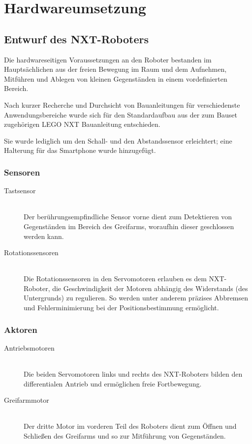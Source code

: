 \chapter{Hardwareumsetzung}
\section{Entwurf des NXT-Roboters}

Die hardwareseitigen Voraussetzungen an den Roboter bestanden im Hauptsächlichen aus der freien Bewegung im Raum und dem Aufnehmen, Mitführen und Ablegen von kleinen Gegenständen in einem vordefinierten Bereich.

Nach kurzer Recherche\cite{building_instructions} und Durchsicht von Bauanleitungen für verschiedenste Anwendungsbereiche wurde sich für den Standardaufbau aus der zum Bauset zugehörigen LEGO NXT Bauanleitung entschieden.

Sie wurde lediglich um den Schall- und den Abstandssensor erleichtert; eine Halterung für das Smartphone wurde hinzugefügt.


\pagebreak

\subsection{Sensoren}

\begin{description}
\item[Tastsensor]\hfill \\
Der berührungsempfindliche Sensor vorne dient zum Detektieren von Gegenständen im Bereich des Greifarms, woraufhin dieser geschlossen werden kann.
\item[Rotationssensoren]\hfill \\
Die Rotationssensoren in den Servomotoren erlauben es dem NXT-Roboter, die Geschwindigkeit der Motoren abhängig des Widerstands (des Untergrunds) zu regulieren. So werden unter anderem präzises Abbremsen und Fehlerminimierung bei der Positionsbestimmung ermöglicht.
\item[]
\end{description}

\subsection{Aktoren}

\begin{description}
\item[Antriebsmotoren]\hfill \\
Die beiden Servomotoren links und rechts des NXT-Roboters bilden den differentialen Antrieb und ermöglichen freie Fortbewegung.
\item[Greifarmmotor]\hfill \\
Der dritte Motor im vorderen Teil des Roboters dient zum Öffnen und Schließen des Greifarms und so zur Mitführung von Gegenständen.
\end{description}

